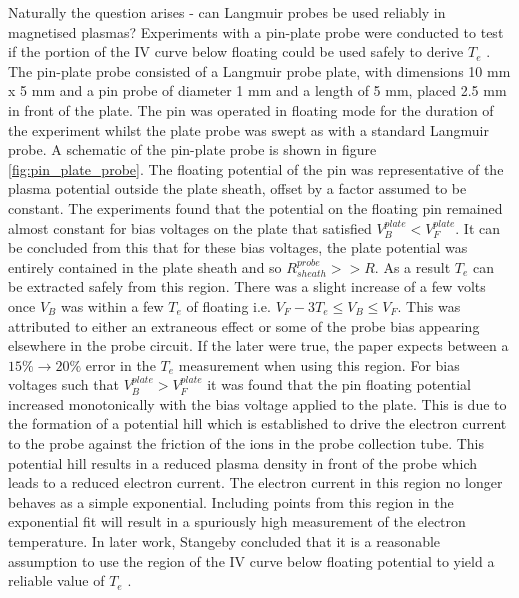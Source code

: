 Naturally the question arises - can Langmuir probes be used reliably in magnetised plasmas? Experiments with a pin-plate probe were conducted to test if the portion of the IV curve below floating could be used safely to derive $T_e$ \cite{pin-plate-pitts}. The pin-plate probe consisted of a Langmuir probe plate, with dimensions 10 mm x 5 mm and a pin probe of diameter 1 mm and a length of 5 mm, placed 2.5 mm in front of the plate. The pin was operated in floating mode for the duration of the experiment whilst the plate probe was swept as with a standard Langmuir probe. A schematic of the pin-plate probe is shown in figure \ref{fig:pin_plate_probe}. The floating potential of the pin was representative of the plasma potential outside the plate sheath, offset by a factor assumed to be constant. The experiments found that the potential on the floating pin remained almost constant for bias voltages on the plate that satisfied $V_B^{plate}  <V_F^{plate}$. It can be concluded from this that for these bias voltages, the plate potential was entirely contained in the plate sheath and so  $R_{sheath}^{probe} >> R$. As a result $T_e$ can be extracted safely from this region. There was a slight increase of a few volts once $V_B$  was within a few $T_e$ of floating i.e. $V_F - 3 T_e \leq V_B \leq V_F$. This was attributed to either an extraneous effect or some of the probe bias appearing elsewhere in the probe circuit. If the later were true, the paper expects between a $15 \% \to 20\%$ error in the $T_e$ measurement when using this region. For bias voltages such that  $V_B^{plate} > V_F^{plate}$ it was found that the pin floating potential increased monotonically with the bias voltage applied to the plate. This is due to the formation of a potential hill which is established to drive the electron current to the probe against the friction of the ions in the probe collection tube. This potential hill results in a reduced plasma density in front of the probe which leads to a reduced electron current. The electron current in this region no longer behaves as a simple exponential. Including points from this region in the exponential fit will result in a spuriously high measurement of the electron temperature. In later work, Stangeby concluded that it is a reasonable assumption to use the region of the IV curve below floating potential to yield a reliable value of $T_e$ \cite{pin-plate-stangeby}.

